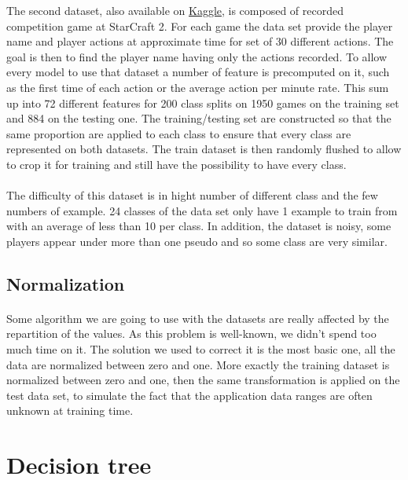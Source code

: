 \documentclass[twocolumn,a4paper,10pt]{article}
\begin{document}
The second dataset, also available on \href{https://www.kaggle.com/c/the-insa-starcraft-2-player-prediction-challenge/data}{Kaggle}, is
composed of recorded competition game at StarCraft 2. For each game
the data set provide the player name and player actions at approximate
time for set of 30 different actions. The goal is then to find the
player name having only the actions recorded. To allow every model
to use that dataset a number of feature is precomputed on it, such
as the first time of each action or the average action per minute
rate. This sum up into 72 different features for 200 class splits
on 1950 games on the training set and 884 on the testing one. The
training/testing set are constructed so that the same proportion are
applied to each class to ensure that every class are represented on
both datasets. The train dataset is then randomly flushed to allow
to crop it for training and still have the possibility to have every
class.

\paragraph{}

The difficulty of this dataset is in hight number of different class
and the few numbers of example. 24 classes of the data set only have
1 example to train from with an average of less than 10 per class.
In addition, the dataset is noisy, some players appear under more
than one pseudo and so some class are very similar.

\subsection{Normalization}

\paragraph{}

Some algorithm we are going to use with the datasets are really affected
by the repartition of the values. As this problem is well-known, we
didn't spend too much time on it. The solution we used to correct
it is the most basic one, all the data are normalized between zero
and one. More exactly the training dataset is normalized between zero
and one, then the same transformation is applied on the test data
set, to simulate the fact that the application data ranges are often
unknown at training time.

\section{Decision tree}
\end{document}
